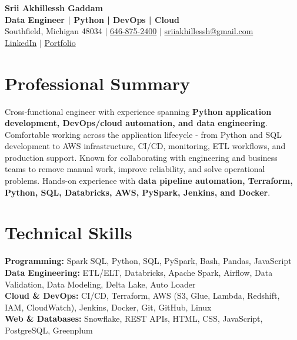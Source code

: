 \documentclass[letterpaper,10pt]{article}
\begin{document}
\fontsize{9.35pt}{10.45pt}\selectfont

\begin{center}
    {\LARGE \textbf{Srii Akhillessh Gaddam}} \\[-1pt]
    \textbf{Data Engineer | Python | DevOps | Cloud} \\[2pt]
    Southfield, Michigan 48034 $|$
    \href{tel:6468752400}{646-875-2400} $|$
    \href{mailto:sriiakhillessh@gmail.com}{sriiakhillessh@gmail.com} \\[1pt]
    \href{https://www.linkedin.com/in/srii-akhiilessh-gaddam-b48668191/}{LinkedIn} $|$
    \href{https://sriiakhillesshg.github.io/portfolio/}{Portfolio}
\end{center}
\vspace{-8pt}

\section{Professional Summary}
\small{Cross-functional engineer with experience spanning \textbf{Python application development, DevOps/cloud automation, and data engineering}. Comfortable working across the application lifecycle - from Python and SQL development to AWS infrastructure, CI/CD, monitoring, ETL workflows, and production support. Known for collaborating with engineering and business teams to remove manual work, improve reliability, and solve operational problems. Hands-on experience with \textbf{data pipeline automation, Terraform, Python, SQL, Databricks, AWS, PySpark, Jenkins, and Docker}.}

\section{Technical Skills}
\small{
\textbf{Programming:} Spark SQL, Python, SQL, PySpark, Bash, Pandas, JavaScript \\
\textbf{Data Engineering:} ETL/ELT, Databricks, Apache Spark, Airflow, Data Validation, Data Modeling, Delta Lake, Auto Loader \\
\textbf{Cloud \& DevOps:} CI/CD, Terraform, AWS (S3, Glue, Lambda, Redshift, IAM, CloudWatch), Jenkins, Docker, Git, GitHub, Linux \\
\textbf{Web \& Databases:} Snowflake, REST APIs, HTML, CSS, JavaScript, PostgreSQL, Greenplum
}

\end{document}
